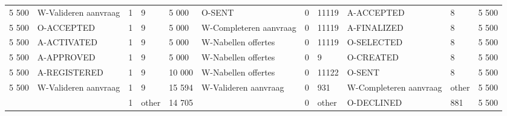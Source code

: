\begin{tabular}{llllllllllr}
5 500 & W-Valideren aanvraag & 1 & 9 & 5 000 & O-SENT & 0 & 11119 & A-ACCEPTED & 8 & 5 500 \\
5 500 & O-ACCEPTED & 1 & 9 & 5 000 & W-Completeren aanvraag & 0 & 11119 & A-FINALIZED & 8 & 5 500 \\
5 500 & A-ACTIVATED & 1 & 9 & 5 000 & W-Nabellen offertes & 0 & 11119 & O-SELECTED & 8 & 5 500 \\
5 500 & A-APPROVED & 1 & 9 & 5 000 & W-Nabellen offertes & 0 & 9 & O-CREATED & 8 & 5 500 \\
5 500 & A-REGISTERED & 1 & 9 & 10 000 & W-Nabellen offertes & 0 & 11122 & O-SENT & 8 & 5 500 \\
5 500 & W-Valideren aanvraag & 1 & 9 & 15 594 & W-Valideren aanvraag & 0 & 931 & W-Completeren aanvraag & other & 5 500 \\
 &  & 1 & other & 14 705 &  & 0 & other & O-DECLINED & 881 & 5 500 \\
\bottomrule
\end{tabular}
